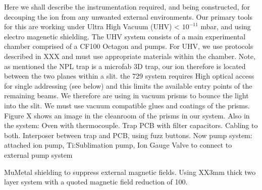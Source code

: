 Here we shall describe the instrumentation required, and being
constructed, for decouping the ion from any unwanted external
environments. Our primary tools for this are working under Ultra High
Vacuum (UHV) < $10^{-11}$ mbar, and using electro magenetic
shielding. The UHV system consists of a main experimental chamber
comprised of a CF100 Octagon and pumps. For UHV, we use protocols
described in XXX and must use appropriate materials within the
chamber. Note, as mentioned the NPL trap is a microfab 3D trap, our
ion therefore is located between the two planes within a slit. the 729
system requires High optical access for single addressing (see below)
and this limits the available entry points of the remaining beams. We
therefore are using in vacuum prisms to bounce the light into the
slit. We must use vacuum compatible glues and coatings of the
prisms. Figure X shows an image in the cleanroom of the prisms in our
system.
Also in the system:
Oven with thermocouple.
Trap PCB with filter capacitors.
Cabling to both.
Interposer between trap and PCB, using fuzz buttons.
Now pump system:
attached ion pump,
Ti:Sublimation pump,
Ion Gauge
Valve to connect to external pump system

MuMetal shielding to suppress external magnetic fields. Using XX3mm
thick two layer system with a quoted magnetic field reduction of 100.


\subtitle{Single Addressing}

